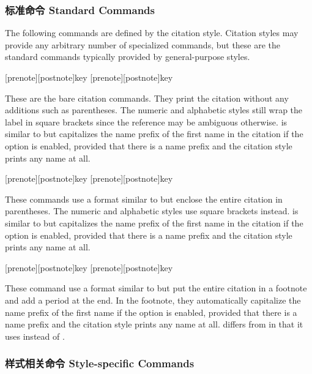 \subsubsection{标准命令 Standard Commands}
\label{use:cit:std}

The following commands are defined by the citation style. Citation styles may provide any arbitrary number of specialized commands, but these are the standard commands typically provided by general-purpose styles.

\begin{ltxsyntax}

[prenote][postnote]{key}
[prenote][postnote]{key}

These are the bare citation commands. They print the citation without any additions such as parentheses. The numeric and alphabetic styles still wrap the label in square brackets since the reference may be ambiguous otherwise.  is similar to  but capitalizes the name prefix of the first name in the citation if the  option is enabled, provided that there is a name prefix and the citation style prints any name at all.

[prenote][postnote]{key}
[prenote][postnote]{key}

These commands use a format similar to  but enclose the entire citation in parentheses. The numeric and alphabetic styles use square brackets instead.  is similar to  but capitalizes the name prefix of the first name in the citation if the  option is enabled, provided that there is a name prefix and the citation style prints any name at all.

[prenote][postnote]{key}
[prenote][postnote]{key}

These command use a format similar to  but put the entire citation in a footnote and add a period at the end. In the footnote, they automatically capitalize the name prefix of the first name if the  option is enabled, provided that there is a name prefix and the citation style prints any name at all.  differs from  in that it uses  instead of .

\end{ltxsyntax}

\subsubsection{样式相关命令 Style-specific Commands}
\label{use:cit:cbx}

